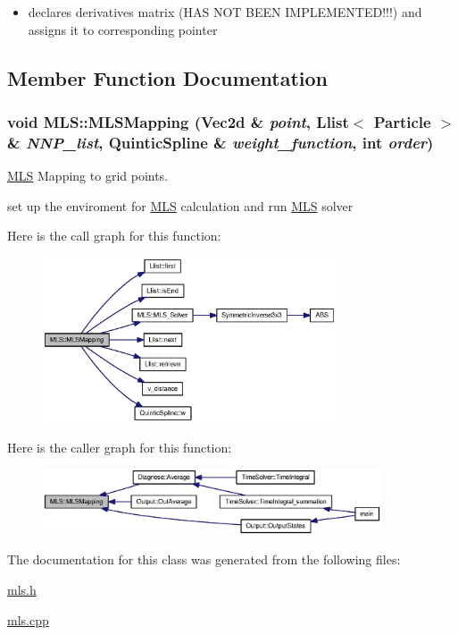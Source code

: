 \begin{itemize}
\item declares derivatives matrix (HAS NOT BEEN IMPLEMENTED!!!) and assigns it to corresponding pointer \end{itemize}


\subsection{Member Function Documentation}
\hypertarget{classMLS_70f00e273459e8fe02baa5a0c06d6f24}{
\subsubsection[{MLSMapping}]{\setlength{\rightskip}{0pt plus 5cm}void MLS::MLSMapping (Vec2d \& {\em point}, \/  {\bf Llist}$<$ {\bf Particle} $>$ \& {\em NNP\_\-list}, \/  {\bf QuinticSpline} \& {\em weight\_\-function}, \/  int {\em order})}}
\label{classMLS_70f00e273459e8fe02baa5a0c06d6f24}


\hyperlink{classMLS}{MLS} Mapping to grid points. 

set up the enviroment for \hyperlink{classMLS}{MLS} calculation and run \hyperlink{classMLS}{MLS} solver 

Here is the call graph for this function:\nopagebreak
\begin{figure}[H]
\begin{center}
\leavevmode
\includegraphics[width=246pt]{classMLS_70f00e273459e8fe02baa5a0c06d6f24_cgraph}
\end{center}
\end{figure}


Here is the caller graph for this function:\nopagebreak
\begin{figure}[H]
\begin{center}
\leavevmode
\includegraphics[width=284pt]{classMLS_70f00e273459e8fe02baa5a0c06d6f24_icgraph}
\end{center}
\end{figure}


The documentation for this class was generated from the following files:\begin{CompactItemize}
\item 
\hyperlink{mls_8h}{mls.h}\item 
\hyperlink{mls_8cpp}{mls.cpp}\end{CompactItemize}
